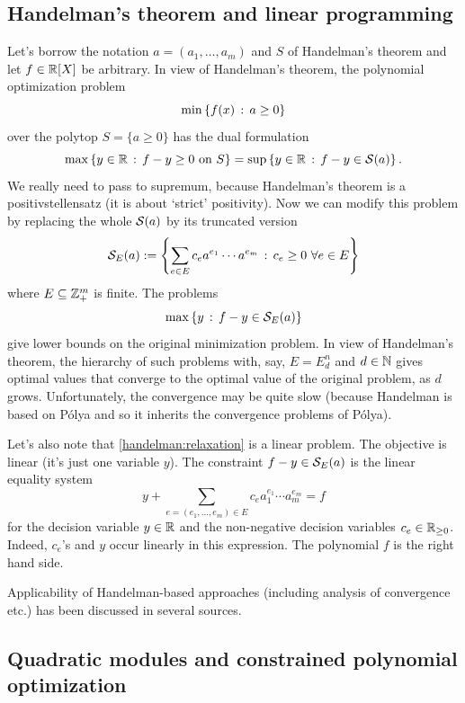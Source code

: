 \subsection{Handelman's theorem and linear programming}

Let's borrow the notation $a=(a_1,\ldots,a_m)$ and $S$ of Handelman's theorem and let $f \in \mathbb{R}[X]$ be arbitrary. In view of Handelman's theorem, the polynomial optimization problem
\[
	\min \left\{ f(x) \,:\, a \ge 0 \right\}
\]
over the polytop $S= \{a \ge 0\}$ has the dual formulation 
\[
	\max \left\{ y \in \mathbb{R} \,:\, f - y \ge 0  \ \text{on} \ S \right\} = \sup \left\{ y \in \mathbb{R} \,:\, f - y \in \mathcal{S}(a) \right\}.
\]
We really need to pass to supremum, because Handelman's theorem is a positivstellensatz (it is about `strict' positivity). Now we can modify this problem by replacing the whole $\mathcal{S}(a)$ by its truncated version
\[
	\mathcal{S}_E (a) := \left\{  \sum_{e \in E} c_e a^{e_1} \cdots a^{e_m} \,:\, c_e \ge 0 \ \forall e \in E \right\}
\]
where $E \subseteq \mathbb{Z}_+^m$ is finite. The problems
\begin{equation}
	\label{handelman:relaxation}
	\max \left\{ y \,:\, f - y \in \mathcal{S}_E(a) \right\}
\end{equation}
give lower bounds on the original minimization problem. In view of Handelman's theorem, the hierarchy of such problems with, say, $E=E^n_d$ and $d \in \mathbb{N}$ gives optimal values that converge to the optimal value of the original problem, as $d$ grows. Unfortunately, the convergence may be quite slow (because Handelman is based on P\'olya and so it inherits the convergence problems of P\'olya).

Let's also note that \eqref{handelman:relaxation} is a linear problem. The objective is linear (it's just one variable $y$). The constraint $f -y \in \mathcal{S}_E(a)$ is the linear equality system 
\[
	 y+ \sum_{e=(e_1,\ldots,e_m) \in E} c_e a_1^{e_1} \cdots a_m^{e_m} = f
\]
for the decision variable $y \in \mathbb{R}$ and the non-negative decision variables $c_e \in \mathbb{R}_{\ge 0}$. Indeed, $c_e$'s and $y$ occur linearly in this expression. The polynomial $f$ is the right hand side. 

\begin{remark}
	Applicability of Handelman-based approaches (including analysis of convergence etc.) has been discussed in several sources. 
\end{remark}

\subsection{Quadratic modules and constrained polynomial optimization} 

